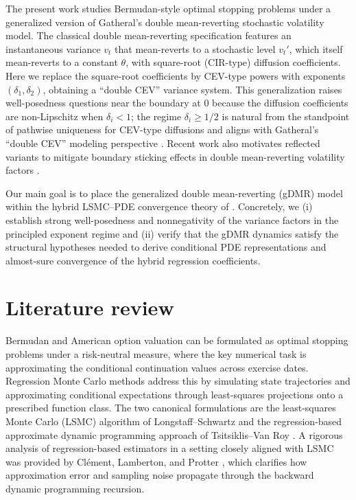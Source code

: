 \documentclass[10pt]{article}
\theoremstyle{plain}
\theoremstyle{definition}
\theoremstyle{remark}
\begin{document}
The present work studies Bermudan-style optimal stopping problems under a generalized version of Gatheral's double mean-reverting stochastic volatility model.
The classical double mean-reverting specification features an instantaneous variance $v_t$ that mean-reverts to a stochastic level $v_t'$, which itself mean-reverts to a constant $\theta$, with square-root (CIR-type) diffusion coefficients.
Here we replace the square-root coefficients by CEV-type powers with exponents $(\delta_1,\delta_2)$, obtaining a ``double CEV'' variance system.
This generalization raises well-posedness questions near the boundary at $0$ because the diffusion coefficients are non-Lipschitz when $\delta_i<1$; the regime $\delta_i\ge 1/2$ is natural from the standpoint of pathwise uniqueness for CEV-type diffusions \citep{yamada1971uniqueness} and aligns with Gatheral's ``double CEV'' modeling perspective \citep{gatheral2006volatility}.
Recent work also motivates reflected variants to mitigate boundary sticking effects in double mean-reverting volatility factors \citep{mishura2025skorokhod}.

Our main goal is to place the generalized double mean-reverting (gDMR) model within the hybrid LSMC--PDE convergence theory of \citet{farahany2020mixing}.
Concretely, we (i) establish strong well-posedness and nonnegativity of the variance factors in the principled exponent regime and (ii) verify that the gDMR dynamics satisfy the structural hypotheses needed to derive conditional PDE representations and almost-sure convergence of the hybrid regression coefficients.







\section{Literature review}

Bermudan and American option valuation can be formulated as optimal stopping problems under a
risk-neutral measure, where the key numerical task is approximating the conditional continuation
values across exercise dates. Regression Monte Carlo methods address
this by simulating state trajectories and approximating conditional expectations through
least-squares projections onto a prescribed function class. The two canonical formulations are
the least-squares Monte Carlo (LSMC) algorithm of Longstaff--Schwartz \citep{longstaff2001valuing}
and the regression-based approximate dynamic programming approach of Tsitsiklis--Van Roy
\citep{tsitsiklis2001regression}. A rigorous analysis of regression-based estimators in a setting
closely aligned with LSMC was provided by Cl\'ement, Lamberton, and Protter \citep{clement2002analysis},
which clarifies how approximation error and sampling noise propagate through the backward
dynamic programming recursion.
\end{document}
